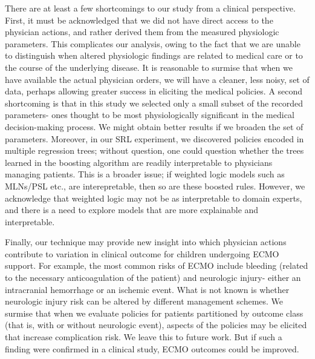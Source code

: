 \documentclass[letterpaper]{article}
\begin{document}
There are at least a few shortcomings to our study from a clinical perspective. First, it must be acknowledged that we did not have direct access to the physician actions, and rather derived them from the measured physiologic parameters. This complicates our analysis, owing to the fact that we are unable to distinguish when altered physiologic findings are related to medical care or to the course of the underlying disease. It is reasonable to surmise that when we have available the actual physician orders, we will have a cleaner, less noisy, set of data, perhaps allowing greater success in eliciting the medical policies. A second shortcoming is that in this study we selected only a small subset of the recorded parameters- ones thought to be most physiologically significant in the medical decision-making process. We might obtain better results if we broaden the set of parameters. Moreover, in our SRL experiment, we discovered policies encoded in multiple regression trees; without question, one could question whether the trees learned in the boosting algorithm are readily interpretable to physicians managing patients. This is a broader issue; if weighted logic models such as MLNs/PSL etc., are interepretable, then so are these boosted rules. However, we acknowledge that weighted logic may not be as interpretable to domain experts, and there is a need to explore models that are more explainable and interpretable.

Finally, our technique may provide new insight into which physician actions contribute to variation in clinical outcome for children undergoing ECMO support. For example, the most common risks of ECMO include bleeding (related to the necessary anticoagulation of the patient) and neurologic injury- either an intracranial hemorrhage or an ischemic event. What is not known is whether neurologic injury risk can be altered by different management schemes. We surmise that when we evaluate policies for patients partitioned by outcome class (that is, with or without neurologic event), aspects of the policies may be elicited that increase complication risk. We leave this to future work. But if such a finding were confirmed in a clinical study, ECMO outcomes could be improved.
\end{document}
